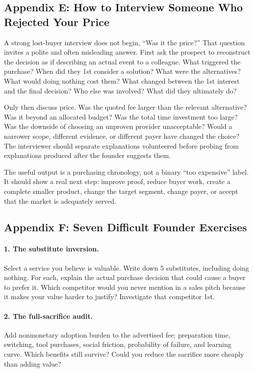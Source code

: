 \subsection*{Appendix E: How to Interview Someone Who Rejected Your Price}

A strong lost-buyer interview does not begin, ``Was it the price?'' That question invites a polite and often misleading answer. First ask the prospect to reconstruct the decision as if describing an actual event to a colleague. What triggered the purchase? When did they 1st consider a solution? What were the alternatives? What would doing nothing cost them? What changed between the 1st interest and the final decision? Who else was involved? What did they ultimately do?

Only then discuss price. Was the quoted fee larger than the relevant alternative? Was it beyond an allocated budget? Was the total time investment too large? Was the downside of choosing an unproven provider unacceptable? Would a narrower scope, different evidence, or different payer have changed the choice? The interviewer should separate explanations volunteered before probing from explanations produced after the founder suggests them.

The useful output is a purchasing chronology, not a binary ``too expensive'' label. It should show a real next step: improve proof, reduce buyer work, create a complete smaller product, change the target segment, change payer, or accept that the market is adequately served.

\subsection*{Appendix F: Seven Difficult Founder Exercises}

\paragraph*{1. The substitute inversion.} Select a service you believe is valuable. Write down 5 substitutes, including doing nothing. For each, explain the actual purchase decision that could cause a buyer to prefer it. Which competitor would you never mention in a sales pitch because it makes your value harder to justify? Investigate that competitor 1st.

\paragraph*{2. The full-sacrifice audit.} Add nonmonetary adoption burden to the advertised fee: preparation time, switching, tool purchases, social friction, probability of failure, and learning curve. Which benefits still survive? Could you reduce the sacrifice more cheaply than adding value?

